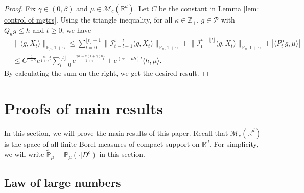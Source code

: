 \documentclass[12pt,a4paper]{amsart}
\theoremstyle{plain}
\theoremstyle{definition}
\numberwithin{equation}{section}
\begin{document}
\begin{proof}
  Fix $\gamma \in (0,\beta)$ and $\mu \in \mathcal M_c(\mathbb R^d)$.
  Let $C$ be the constant in Lemma \ref{lem: control of mgtrs}.
  Using the triangle inequality, for all $\kappa\in \mathbb Z_+$, $g \in \mathcal P$ with $Q_\kappa g \leq h$ and $t\geq 0$, we have
\begin{align}
  & \|\langle g,X_t\rangle\|_{\mathbb P_\mu;1+\gamma}
    \leq \sum_{l=0}^{\lfloor t\rfloor - 1}\big\| \mathcal{I}_{t-l-1}^{t-l}\langle g,X_t\rangle \big\|_{\mathbb P_\mu;1+\gamma}+\big\| \mathcal{I}_{0}^{t-\lfloor t \rfloor}\langle g,X_t\rangle  \big\|_{\mathbb P_\mu;1+\gamma} + |\langle P^\alpha_t g,\mu\rangle| \\
  & \leq C^{\frac{1}{1+\gamma}} e^{\frac{\alpha}{1+\gamma}t} \sum_{l=0}^{\lfloor t\rfloor} e^{\frac{\gamma\alpha-\kappa (1+\gamma)b}{1+\gamma} l} + e^{(\alpha - \kappa b)t} \langle h,\mu\rangle.
\end{align}
By calculating the sum on the right, we get the desired result.
\end{proof}


\section{Proofs of main results}
\label{proofs of main results}
In this section, we will prove the main results of this paper. Recall that $\mathcal{M}_c(\mathbb{R}^d)$ is the space of all finite Borel measures of compact support on $\mathbb{R}^d$.
For simplicity, we will write $\mathbb{\widetilde{P}}_{\mu}=\mathbb{P}_{\mu}(\cdot|D^c)$ in this section.

\subsection{Law of large numbers}
\label{sec: large rate lln}
\end{document}
